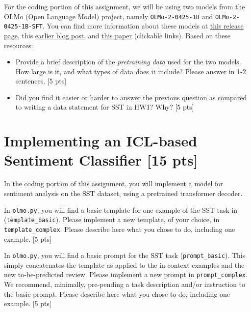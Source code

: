 \documentclass[11pt]{article}
\begin{document}
 For the coding portion of this assignment, we will be using two models from the OLMo (Open Language Model) project, namely \texttt{OLMo-2-0425-1B} and \texttt{OLMo-2-0425-1B-SFT}.  You can find more information about these models at \href{https://allenai.org/olmo/release-notes#olmo-2-1b}{this release page}, this \href{https://allenai.org/blog/olmo2}{earlier blog post}, and \href{https://arxiv.org/abs/2501.00656}{this paper} (clickable links).  Based on these resources:
\begin{itemize}
  \item Provide a brief description of the \emph{pretraining data} used for the two models.  How large is it, and what types of data does it include?  Please answer in 1-2 sentences. \hfill [5 pts]
  \item Did you find it easier or harder to answer the previous question as compared to writing a data statement for SST in HW1? Why? \hfill [5 pts]
\end{itemize}



\section{Implementing an ICL-based Sentiment Classifier [15 pts]}

In the coding portion of this assignment, you will implement a model for sentiment analysis on the SST dataset, using a pretrained transformer decoder.  

\vspace{2em}
  In \texttt{olmo.py}, you will find a basic template for one example of the SST task in (\texttt{template\_basic}).  Please implement a new template, of your choice, in \texttt{template\_complex}.  Please describe here what you chose to do, including one example. \hfill [5 pts]

\vspace{2em}
  In \texttt{olmo.py}, you will find a basic prompt for the SST task (\texttt{prompt\_basic}).  This simply concatenates the template as applied to the in-context examples and the new to-be-predicted review.  Please implement a new prompt in \texttt{prompt\_complex}.  We recommend, minimally, pre-pending a task description and/or instruction to the basic prompt. Please describe here what you chose to do, including one example. \hfill [5 pts]
\end{document}
